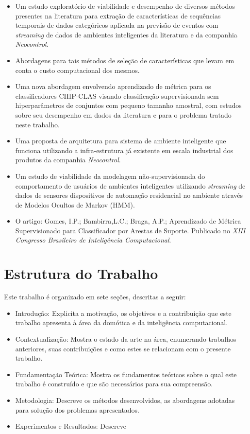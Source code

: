 \documentclass[
	12pt,				%
	openright,			%
	twoside,			%
	a4paper,			%
	english,			%
	spanish,			%
	brazil,				%
	]{abntex2}\usepackage[]{graphicx}\usepackage[]{color}
\begin{document}
\begin{itemize}
	\item Um estudo exploratório de viabilidade e desempenho de diversos métodos presentes na literatura para extração de características de sequências temporais de dados categóricos aplicada na previsão de eventos com \textit{streaming} de dados de ambientes inteligentes da literatura e da companhia \textit{Neocontrol}.
	\item Abordagens para tais métodos de seleção de características que levam em conta o custo computacional dos mesmos.
	\item Uma nova abordagem envolvendo aprendizado de métrica para os classificadores CHIP-CLAS visando classificação supervisionada sem hiperparâmetros de conjuntos com pequeno tamanho amostral, com estudos sobre seu desempenho em dados da literatura e para o problema tratado neste trabalho.
	\item Uma proposta de arquitetura para sistema de ambiente inteligente que funciona utilizando a infra-estrutura já existente em escala industrial dos produtos da companhia \textit{Neocontrol}.
	\item Um estudo de viabilidade da modelagem não-supervisionada do comportamento de usuários de ambientes inteligentes utilizando \textit{streaming} de dados de sensores dispositivos de automação residencial no ambiente através de Modelos Ocultos de Markov (HMM).
	\item O artigo: Gomes, I.P.; Bambirra,L.C.; Braga, A.P.; Aprendizado de Métrica Supervisionado para Classificador por Arestas de Suporte. Publicado no \textit{XIII Congresso Brasileiro de Inteligência Computacional}.
\end{itemize}

\section{Estrutura do Trabalho}

Este trabalho é organizado em sete seções, descritas a seguir:

\begin{itemize}
    \item{Introdução:} Explicita a motivação, os objetivos e a contribuição que este trabalho apresenta à área da domótica e da inteligência computacional.
    \item{Contextualização:} Mostra o estado da arte na área, enumerando trabalhos anteriores, suas contribuições e como estes se relacionam com o presente trabalho.
    \item{Fundamentação Teórica:} Mostra os fundamentos teóricos sobre o qual este trabalho é construído e que são necessários para sua compreensão.
    \item{Metodologia:} Descreve os métodos desenvolvidos, as abordagens adotadas para solução dos problemas apresentados.
    \item{Experimentos e Resultados:} Descreve 
\end{itemize}
\end{document}
